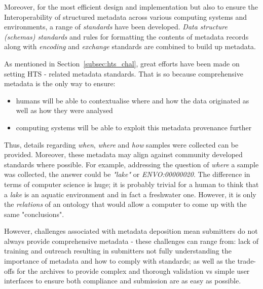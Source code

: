      Moreover, for the most efficient design and implementation 
      but also to ensure the Interoperability of structured metadata 
      across various computing systems and environments, 
      a range of \textit{standards} have been developed.  
      \textit{Data structure (schemas) standards} and
      rules for formatting the contents of metadata records 
      along with
      \textit{encoding} and \textit{exchange} standards 
      are combined to build up metadata.

      As mentioned in Section~\ref{subsec:hts_chal}, great efforts have been 
      made on setting 
      HTS - related metadata standards.
      That is so because comprehensive metadata is the only 
      way to ensure:
      \begin{itemize}
         \item humans will be able to contextualise where and how the data originated as well as how they were analysed
         \item computing systems will be able to exploit this metadata provenance further
      \end{itemize} 
      Thus, 
      details regarding \textit{when}, \textit{where} and \textit{how} samples were collected 
      can be provided. 
      Moreover, these metadata may align against community developed standards where possible. 
      For example, addressing the question of \textit{where} a sample was collected, 
      the answer could be \textit{"lake"} or \textit{ENVO:00000020}.
      The difference in terms of computer science is huge; 
      it is probably trivial for a human to think that a \textit{lake} is an aquatic
      environment and in fact a freshwater one. 
      However, it is only the \textit{relations} of an ontology that would allow 
      a computer to come up with the same "conclusions". 

      However, challenges associated with metadata deposition 
      mean submitters do not always provide comprehensive metadata - 
      these challenges can range from: lack of training and outreach resulting 
      in submitters not fully understanding the importance of metadata and 
      how to comply with standards; 
      as well as the trade-offs for the archives to provide complex and 
      thorough validation vs simple user interfaces to ensure 
      both compliance and submission are as easy as possible.








